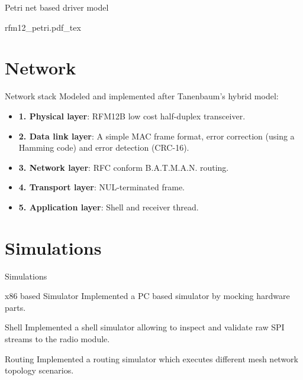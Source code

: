 \begin{frame}{Petri net based driver model}
\begin{center}
\scalebox{0.8} {
    {rfm12_petri.pdf_tex}
}
\end{center}
\end{frame}

\section{Network}
\begin{frame}{Network stack}
Modeled and implemented after Tanenbaum's hybrid model:

\begin{itemize}
    \item \textbf{1. Physical layer}: RFM12B low cost half-duplex transceiver.
    \item \textbf{2. Data link layer}: A simple MAC frame format, error correction (using a Hamming code) and error detection (CRC-16).
    \item \textbf{3. Network layer}: RFC conform B.A.T.M.A.N. routing.
    \item \textbf{4. Transport layer}: NUL-terminated frame.
    \item \textbf{5. Application layer}: Shell and receiver thread.
\end{itemize}
\end{frame}

\section{Simulations}
\begin{frame}{Simulations}
\begin{block}{x86 based Simulator}
Implemented a PC based simulator by mocking hardware parts.
\end{block}

\begin{block}{Shell}
Implemented a shell simulator allowing to inspect and validate raw SPI streams to the radio module.
\end{block}

\begin{block}{Routing}
Implemented a routing simulator which executes different mesh network topology scenarios. 
\end{block}
\end{frame}

